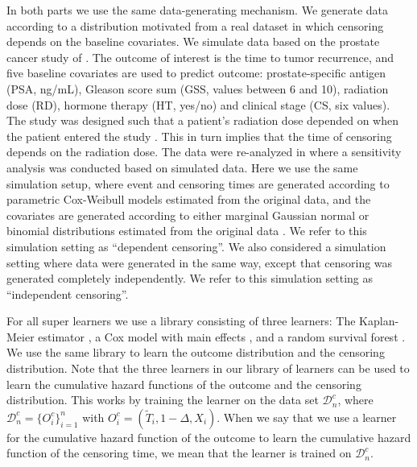 \documentclass[numsec,webpdf,contemporary,medium,namedate]{oup-authoring-template}%
\theoremstyle{thmstyleone}%
\theoremstyle{thmstyletwo}%
\theoremstyle{thmstylethree}%
\newcommand{\1}{\mathds{1}}
\newcommand{\data}{\ensuremath{\mathcal{D}}}
\begin{document}
In both parts we use the same data-generating mechanism. We generate
data according to a distribution motivated from a real dataset in
which censoring depends on the baseline covariates. We simulate data
based on the prostate cancer study of
\cite{kattan2000pretreatment}. The outcome of interest is the time to
tumor recurrence, and five baseline covariates are used to predict
outcome: prostate-specific antigen (PSA, ng/mL), Gleason score sum
(GSS, values between 6 and 10), radiation dose (RD), hormone therapy
(HT, yes/no) and clinical stage (CS, six values). The study was
designed such that a patient's radiation dose depended on when the
patient entered the study \citep{gerds2013estimating}. This in turn
implies that the time of censoring depends on the radiation dose. The
data were re-analyzed in \citep{gerds2013estimating} where a
sensitivity analysis was conducted based on simulated data. Here we use the
same simulation setup, where event and censoring times are generated
according to parametric Cox-Weibull models estimated from the original
data, and the covariates are generated according to either marginal
Gaussian normal or binomial distributions estimated from the original
data \citep[c.f.,][Section~4.6]{gerds2013estimating}. We refer to this
simulation setting as ``dependent censoring''. We also considered a
simulation setting where data were generated in the same way, except
that censoring was generated completely independently. We refer to
this simulation setting as ``independent censoring''.

For all super learners we use a library consisting of three learners:
The Kaplan-Meier estimator
\citep{kaplan1958nonparametric,Gerds_2019prodlim}, a Cox model with
main effects \citep{cox1972regression, survival-package}, and a random
survival forest \citep{ishwaran2008random,rfsrc-paclage}. We use the
same library to learn the outcome distribution and the censoring
distribution. Note that the three learners in our library of learners
can be used to learn the cumulative hazard functions of the 
outcome and the censoring distribution. This works by
training the learner on the data set \( \data_n^c \), where
\( \data_n^c = \{O_i^c\}_{i=1}^n \) with
\( O_i^c = (\tilde{T}_i, 1-\Delta, X_i) \). When we say that we use a
learner for the cumulative hazard function of the outcome to learn the
cumulative hazard function of the censoring time, we mean that the
learner is trained on \( \data_n^c \).
\end{document}
